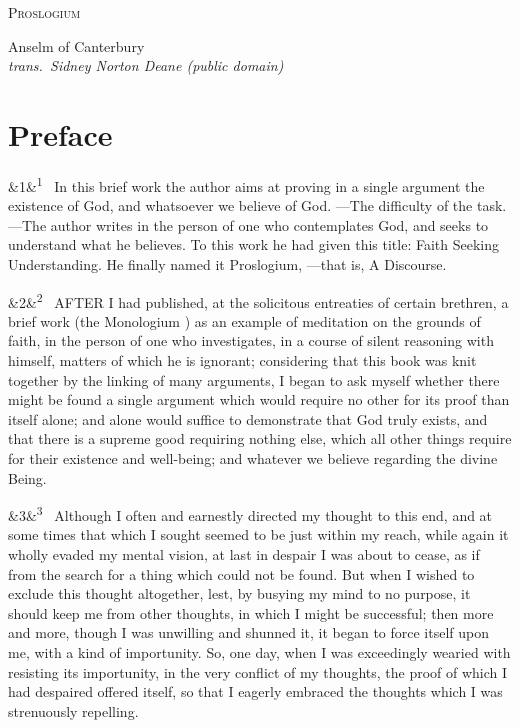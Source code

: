 \documentclass[12pt]{article}
\newcommand{\work}[1]{\begin{center}\LARGE\scshape #1\end{center}}
\newcommand{\attrib}[2]{\begin{center}\large #1\\[2pt]\small\itshape trans.\ #2\end{center}\vspace{1em}}
\newcommand{\para}[1][]{\par\noindent\ifx&#1&\else\textsuperscript{\footnotesize #1}~\fi}
\begin{document}
\work{Proslogium}

\attrib{Anselm of Canterbury}{Sidney Norton Deane (public domain)}


\section*{Preface}

\para[1] In this brief work the author aims at proving in a single argument the existence of God, and whatsoever we believe of God. ---The difficulty of the task. ---The author writes in the person of one who contemplates God, and seeks to understand what he believes. To this work he had given this title: Faith Seeking Understanding. He finally named it Proslogium, ---that is, A Discourse.

\para[2] AFTER I had published, at the solicitous entreaties of certain brethren, a brief work (the Monologium ) as an example of meditation on the grounds of faith, in the person of one who investigates, in a course of silent reasoning with himself, matters of which he is ignorant; considering that this book was knit together by the linking of many arguments, I began to ask myself whether there might be found a single argument which would require no other for its proof than itself alone; and alone would suffice to demonstrate that God truly exists, and that there is a supreme good requiring nothing else, which all other things require for their existence and well-being; and whatever we believe regarding the divine Being.

\para[3] Although I often and earnestly directed my thought to this end, and at some times that which I sought seemed to be just within my reach, while again it wholly evaded my mental vision, at last in despair I was about to cease, as if from the search for a thing which could not be found. But when I wished to exclude this thought altogether, lest, by busying my mind to no purpose, it should keep me from other thoughts, in which I might be successful; then more and more, though I was unwilling and shunned it, it began to force itself upon me, with a kind of importunity. So, one day, when I was exceedingly wearied with resisting its importunity, in the very conflict of my thoughts, the proof of which I had despaired offered itself, so that I eagerly embraced the thoughts which I was strenuously repelling.
\end{document}
